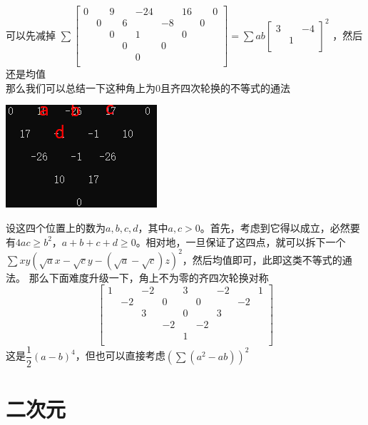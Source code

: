 \documentclass[UTF8]{ctexart}
\begin{document}
可以先减掉
$\displaystyle \sum 
\left[\begin{matrix}
	0& &9& &-24& &16& &0\\
	&0& &6& &-8& &0&\\
	& &0& &1& &0& &\\
	& & &0& &0& & &\\
	& & & &0& & & &\\
\end{matrix}\right]
=\displaystyle \sum ab
\left[\begin{matrix}
	3& &-4 \\
	& 1&\\
\end{matrix}\right]^{2} $
，然后还是均值\\
那么我们可以总结一下这种角上为0且齐四次轮换的不等式的通法
\begin{center}
	\includegraphics[width=0.3\linewidth]{270}
\end{center}
设这四个位置上的数为$ a,b,c,d $，其中$ a,c> 0 $。首先，考虑到它得以成立，必然要有$ 4ac≥b^{2} $，$ a+b+c+d\geq 0 $。相对地，一旦保证了这四点，就可以拆下一个\\
$ \displaystyle \sum xy(\sqrt{a}x-\sqrt{c}y-(\sqrt{a}-\sqrt{c})z)^{2} $，然后均值即可，此即这类不等式的通法。
那么下面难度升级一下，角上不为零的齐四次轮换对称
\renewcommand*{\arraystretch}{1.732}\[
\left[\begin{matrix}
	1& &-2& &3& &-2& &1\\
	&-2& &0& &0& &-2&\\
	& &3& &0& &3& &\\
	& & &-2& &-2& & &\\
	& & & &1& & & &\\
\end{matrix}\right]
\]
这是$ \dfrac{1}{2}(a-b)^{4} $，但也可以直接考虑$ (\displaystyle \sum (a^{2}-ab))^{2} $
\section{二次元}
\end{document}
